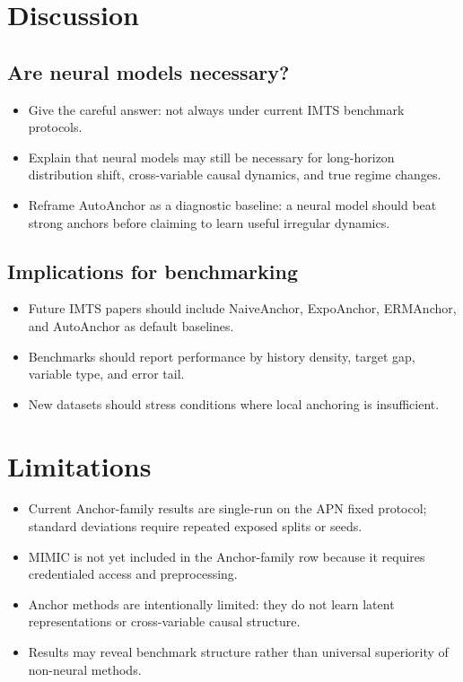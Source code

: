 \documentclass{article}
\newcommand{\method}{AutoAnchor}
\begin{document}
\section{Discussion}

\subsection{Are neural models necessary?}

\begin{itemize}
    \item Give the careful answer: not always under current IMTS benchmark
    protocols.
    \item Explain that neural models may still be necessary for long-horizon
    distribution shift, cross-variable causal dynamics, and true regime changes.
    \item Reframe \method{} as a diagnostic baseline: a neural model should beat
    strong anchors before claiming to learn useful irregular dynamics.
\end{itemize}

\subsection{Implications for benchmarking}

\begin{itemize}
    \item Future IMTS papers should include NaiveAnchor, ExpoAnchor, ERMAnchor,
    and \method{} as default baselines.
    \item Benchmarks should report performance by history density, target gap,
    variable type, and error tail.
    \item New datasets should stress conditions where local anchoring is
    insufficient.
\end{itemize}

\section{Limitations}

\begin{itemize}
    \item Current Anchor-family results are single-run on the APN fixed protocol;
    standard deviations require repeated exposed splits or seeds.
    \item MIMIC is not yet included in the Anchor-family row because it requires
    credentialed access and preprocessing.
    \item Anchor methods are intentionally limited: they do not learn latent
    representations or cross-variable causal structure.
    \item Results may reveal benchmark structure rather than universal
    superiority of non-neural methods.
\end{itemize}
\end{document}
